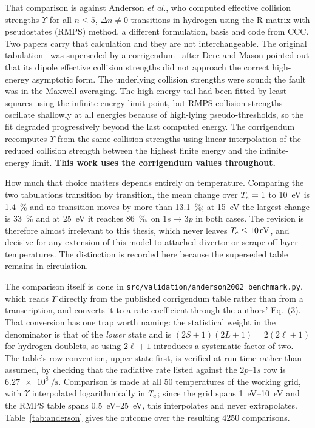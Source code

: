 That comparison is against Anderson \emph{et al.}, who computed effective
collision strengths $\Upsilon$ for all $n \le 5$, $\Delta n \ne 0$ transitions in
hydrogen using the R-matrix with pseudostates (RMPS) method, a different
formulation, basis and code from CCC. Two papers carry that calculation and they
are not interchangeable. The original tabulation~\cite{Anderson2000} was
superseded by a corrigendum~\cite{Anderson2002} after Dere and Mason pointed out
that its dipole effective collision strengths did not approach the correct
high-energy asymptotic form. The underlying collision strengths were sound; the
fault was in the Maxwell averaging. The high-energy tail had been fitted by least
squares using the infinite-energy limit point, but RMPS collision strengths
oscillate shallowly at all energies because of high-lying pseudo-thresholds, so
the fit degraded progressively beyond the last computed energy. The corrigendum
recomputes $\Upsilon$ from the same collision strengths using linear
interpolation of the reduced collision strength between the highest finite energy
and the infinite-energy limit. \textbf{This work uses the corrigendum values
throughout.}

How much that choice matters depends entirely on temperature. Comparing the two
tabulations transition by transition, the mean change over $T_e = 1$ to
\SI{10}{\electronvolt} is \SI{1.4}{\percent} and no transition moves by more
than \SI{13.1}{\percent}; at \SI{15}{\electronvolt} the largest change is
\SI{33}{\percent} and at \SI{25}{\electronvolt} it reaches \SI{86}{\percent},
on $1s \to 3p$ in both cases. The revision is therefore almost irrelevant to
this thesis, which never leaves $T_e \le \SI{10}{\electronvolt}$, and decisive
for any extension of this model to attached-divertor or scrape-off-layer
temperatures. The distinction is recorded here because the superseded table
remains in circulation.

The comparison itself is done in
\texttt{src/validation/anderson2002\_benchmark.py}, which reads $\Upsilon$
directly from the published corrigendum table rather than from a transcription,
and converts it to a rate coefficient through the authors' Eq.~(3). That
conversion has one trap worth naming: the statistical weight in the denominator
is that of the \emph{lower} state and is $(2S+1)(2L+1) = 2(2\ell+1)$ for
hydrogen doublets, so using $2\ell+1$ introduces a systematic factor of two. The
table's row convention, upper state first, is verified at run time rather than
assumed, by checking that the radiative rate listed against the $2p$--$1s$ row is
$\SI{6.27e8}{\per\second}$. Comparison is made at all 50 temperatures of the
working grid, with $\Upsilon$ interpolated logarithmically in $T_e$; since the
grid spans \SIrange{1}{10}{\electronvolt} and the RMPS table spans
\SIrange{0.5}{25}{\electronvolt}, this interpolates and never extrapolates.
Table~\ref{tab:anderson} gives the outcome over the resulting 4250 comparisons.

